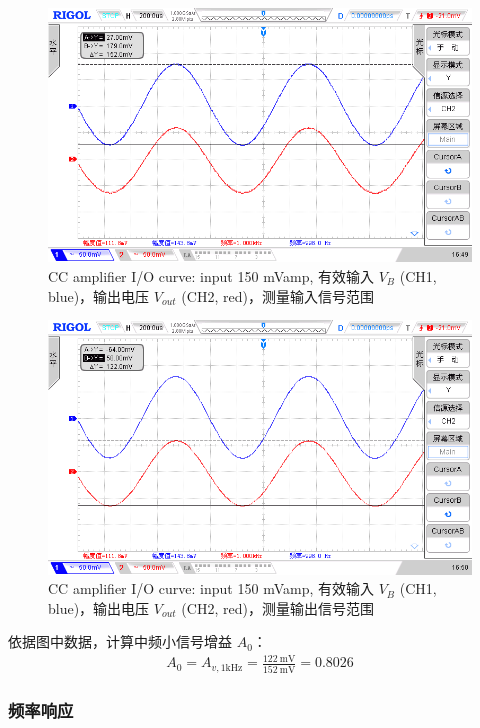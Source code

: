 \documentclass[UTF8]{article}
\begin{document}
\begin{figure}[H]\centering
    \includegraphics[width=\columnwidth]{LCE-02-三极管/assets/CC 输入 150 mV.png}
    \caption{CC amplifier I/O curve: input 150 mVamp, 有效输入 $V_{B}$ (CH1, blue)，输出电压 $V_{out}$ (CH2, red)，测量输入信号范围}
\end{figure}
\begin{figure}[H]\centering
    \includegraphics[width=\columnwidth]{LCE-02-三极管/assets/CC 输出 (约 122mV).png}
    \caption{CC amplifier I/O curve: input 150 mVamp, 有效输入 $V_{B}$ (CH1, blue)，输出电压 $V_{out}$ (CH2, red)，测量输出信号范围}
\end{figure}
依据图中数据，计算中频小信号增益 $A_0$：
\begin{gather}
A_0 = A_{v,1\mathrm{kHz}} = \frac{122 \ \mathrm{mV}}{152 \ \mathrm{mV}} = 0.8026
\end{gather}



\subsubsection{频率响应}
\end{document}
